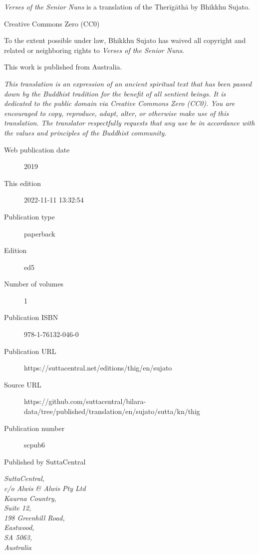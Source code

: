 \documentclass[12pt,openany]{book}%
\begin{document}
\begin{footnotesize}

\textit{Verses of the Senior Nuns} is a translation of the Therīgāthā by Bhikkhu Sujato.

\medskip

Creative Commons Zero (CC0)

To the extent possible under law, Bhikkhu Sujato has waived all copyright and related or neighboring rights to \textit{Verses of the Senior Nuns}.

\medskip

This work is published from Australia.

\begin{center}
\textit{This translation is an expression of an ancient spiritual text that has been passed down by the Buddhist tradition for the benefit of all sentient beings. It is dedicated to the public domain via Creative Commons Zero (CC0). You are encouraged to copy, reproduce, adapt, alter, or otherwise make use of this translation. The translator respectfully requests that any use be in accordance with the values and principles of the Buddhist community.}
\end{center}

\medskip

\begin{description}
    \item[Web publication date] 2019
    \item[This edition] 2022-11-11 13:32:54
    \item[Publication type] paperback
    \item[Edition] ed5
    \item[Number of volumes] 1
    \item[Publication ISBN] 978-1-76132-046-0
    \item[Publication URL] https://suttacentral.net/editions/thig/en/sujato
    \item[Source URL] https://github.com/suttacentral/bilara-data/tree/published/translation/en/sujato/sutta/kn/thig
    \item[Publication number] scpub6
\end{description}

\medskip

Published by SuttaCentral

\medskip

\textit{SuttaCentral,\\
c/o Alwis \& Alwis Pty Ltd\\
Kaurna Country,\\
Suite 12,\\
198 Greenhill Road,\\
Eastwood,\\
SA 5063,\\
Australia}

\end{footnotesize}
\end{document}
